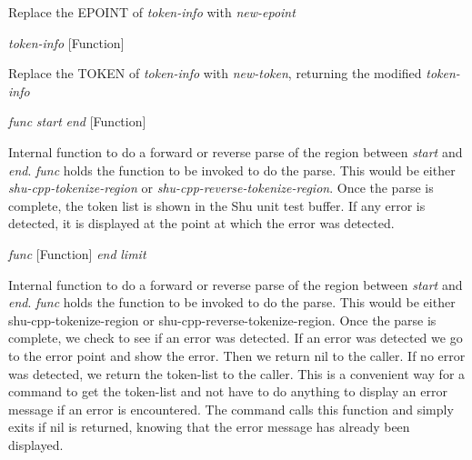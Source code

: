 \begin{doc-string}
Replace the EPOINT of \emph{token-info} with \emph{new-epoint}
\end{doc-string}

\vspace{1em}
\noindent
{}
\usebox{\funcname}\emph{token-info}
 \hfill [Function]
\hspace*{\wd\funcname}

\begin{doc-string}
Replace the TOKEN of \emph{token-info} with \emph{new-token}, returning the
modified \emph{token-info}
\end{doc-string}

\vspace{1em}
\noindent
{}
\usebox{\funcname}\emph{func} \emph{start} \emph{end}
 \hfill [Function]

\begin{doc-string}
Internal function to do a forward or reverse parse of the region between \emph{start}
and \emph{end}.  \emph{func} holds the function to be invoked to do the parse.  This would be
either \emph{shu-cpp-tokenize-region} or \emph{shu-cpp-reverse-tokenize-region}.  Once the
parse is complete, the token list is shown in the Shu unit test buffer.  If any
error is detected, it is displayed at the point at which the error was
detected.
\end{doc-string}

\vspace{1em}
\noindent
{}
\usebox{\funcname}\emph{func}
 \hfill [Function]
\hspace*{\wd\funcname}\emph{end}
\hspace*{\wd\funcname}\emph{limit}

\begin{doc-string}
Internal function to do a forward or reverse parse of the region between \emph{start}
and \emph{end}.  \emph{func} holds the function to be invoked to do the parse.  This would be
either shu-cpp-tokenize-region or shu-cpp-reverse-tokenize-region.  Once the
parse is complete, we check to see if an error was detected.  If an error was
detected we go to the error point and show the error.  Then we return nil to the
caller.  If no error was detected, we return the token-list to the caller.  This
is a convenient way for a command to get the token-list and not have to do anything
to display an error message if an error is encountered.  The command calls this
function and simply exits if nil is returned, knowing that the error message has
already been displayed.
\end{doc-string}

